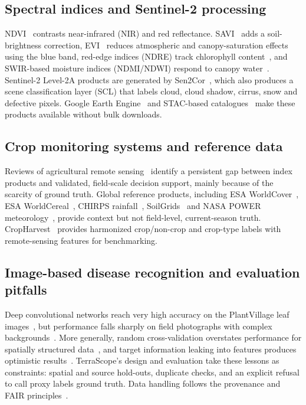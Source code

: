 \documentclass[conference]{IEEEtran}
\begin{document}
\subsection{Spectral indices and Sentinel-2 processing}
NDVI~\cite{rouse1974} contrasts near-infrared (NIR) and red reflectance. SAVI~\cite{huete1988} adds a soil-brightness correction, EVI~\cite{huete2002} reduces atmospheric and canopy-saturation effects using the blue band, red-edge indices (NDRE) track chlorophyll content~\cite{gitelson1994}, and SWIR-based moisture indices (NDMI/NDWI) respond to canopy water~\cite{gao1996}. Sentinel-2 Level-2A products are generated by Sen2Cor~\cite{mainknorn2017}, which also produces a scene classification layer (SCL) that labels cloud, cloud shadow, cirrus, snow and defective pixels. Google Earth Engine~\cite{gorelick2017} and STAC-based catalogues~\cite{stac} make these products available without bulk downloads.

\subsection{Crop monitoring systems and reference data}
Reviews of agricultural remote sensing~\cite{mulla2013,weiss2020} identify a persistent gap between index products and validated, field-scale decision support, mainly because of the scarcity of ground truth. Global reference products, including ESA WorldCover~\cite{zanaga2022}, ESA WorldCereal~\cite{vantricht2023}, CHIRPS rainfall~\cite{funk2015}, SoilGrids~\cite{poggio2021} and NASA POWER meteorology~\cite{nasapower}, provide context but not field-level, current-season truth. CropHarvest~\cite{tseng2021} provides harmonized crop/non-crop and crop-type labels with remote-sensing features for benchmarking.

\subsection{Image-based disease recognition and evaluation pitfalls}
Deep convolutional networks reach very high accuracy on the PlantVillage leaf images~\cite{hughes2015,mohanty2016,ferentinos2018}, but performance falls sharply on field photographs with complex backgrounds~\cite{mohanty2016,barbedo2018}. More generally, random cross-validation overstates performance for spatially structured data~\cite{roberts2017,ploton2020}, and target information leaking into features produces optimistic results~\cite{kaufman2012}. TerraScope's design and evaluation take these lessons as constraints: spatial and source hold-outs, duplicate checks, and an explicit refusal to call proxy labels ground truth. Data handling follows the provenance and FAIR principles~\cite{provdm2013,wilkinson2016}.
\end{document}
